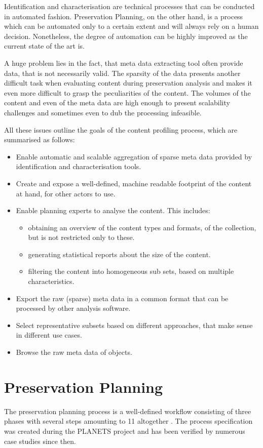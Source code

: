 Identification and characterisation are technical processes that can be conducted in automated fashion. Preservation Planning, on the other hand, is a process which can be automated only to a certain extent and will always rely on a human decision. Nonetheless, the degree of automation can be highly improved as the current state of the art is. 

A huge problem lies in the fact, that meta data extracting tool often provide data, that is not necessarily valid. The sparsity of the data presents another difficult task when evaluating content during preservation analysis and makes it even more difficult to grasp the peculiarities of the content. The volumes of the content and even of the meta data are high enough to present scalability challenges and sometimes even to dub the processing infeasible.

All these issues outline the goals of the content profiling process, which are summarised as follows:

\begin{itemize}
\item Enable automatic and scalable aggregation of sparse meta data provided by identification and characterisation tools.
\item Create and expose a well-defined, machine readable footprint of the content at hand, for other actors to use.
\item Enable planning experts to analyse the content. This includes:
 \begin{itemize}
  \item obtaining an overview of the content types and formats, of the collection, but is not restricted only to these.
  \item generating statistical reports about the size of the content.
  \item filtering the content into homogeneous sub sets, based on multiple characteristics.
 \end{itemize}
\item Export the raw (sparse) meta data in a common format that can be processed by other analysis software.
\item Select representative subsets based on different approaches, that make sense in different use cases.
\item Browse the raw meta data of objects.
\end{itemize}

\section{Preservation Planning}
The preservation planning process is a well-defined workflow consisting of three phases with several steps amounting to 11 altogether \cite{STR07_jcdl}. The process specification was created during the PLANETS project and has been verified by numerous case studies since then. 

